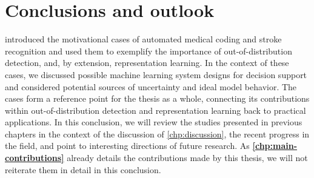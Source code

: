 
\chapter[conclusions and outlook]{Conclusions and outlook}\label{chp:conclusion}

\textbf{} introduced the motivational cases of automated medical coding and stroke recognition and used them to exemplify the importance of out-of-distribution detection, and, by extension, representation learning. In the context of these cases, we discussed possible machine learning system designs for decision support and considered potential sources of uncertainty and ideal model behavior. 
The cases form a reference point for the thesis as a whole, connecting its contributions within out-of-distribution detection and representation learning back to practical applications. 
In this conclusion, we will review the studies presented in previous chapters in the context of the discussion of \cref{chp:discussion}, the recent progress in the field, and point to interesting directions of future research.
As \textbf{\cref{chp:main-contributions}} already details the contributions made by this thesis, we will not reiterate them in detail in this conclusion. 



